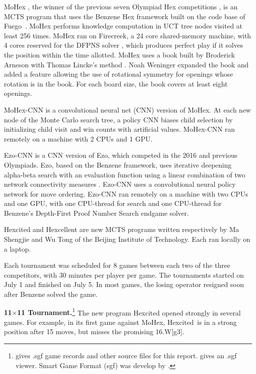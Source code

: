 \documentclass{icga}
\def\Eo{\mbox{\sc Ezo}}
\def\Ec{\mbox{\sc Ezo-CNN}}
\def\Hite{\mbox{\sc Hexcited}}
\def\Hent{\mbox{\sc Hexcellent}}
\def\Mx{\mbox{\sc MoHex}}
\def\Mc{\mbox{\sc MoHex-CNN}}
\def\Fuego{\mbox{\sc Fuego}}
\begin{document}
\Mx{} ,
the winner of the previous seven Olympiad Hex competitions ,
is an MCTS program that uses the Benzene Hex framework
built on the code base of \Fuego\ .
\Mx{} performs knowledge computation 
in UCT tree nodes visited at least 256 times.
\Mx{} ran on Firecreek, a 24 core shared-memory machine, 
with 4 cores reserved for the 
DFPNS solver , which
produces perfect play if it solves the
position within the time allotted.
\Mx{} uses a book built by Broderick Arneson with Thomas Lincke's method 
. 
Noah Weninger expanded the book and added a feature
allowing the use of rotational symmetry for openings
whose rotation is in the book.
For each board size, the book covers at least eight openings.

\Mc{} is a convolutional neural net (CNN) version of \Mx{}. 
At each new node of the Monte Carlo search tree, 
a policy CNN biases child selection by
initializing child visit and win counts with artificial values.
\Mc{} ran remotely on a machine with 2 CPUs and 1 GPU.

\Ec{} is a CNN version of \Eo{}, which competed
in the 2016 and previous Olympiads.
\Eo{}, based on the Benzene framework, 
uses iterative deepening alpha-beta search 
with an evaluation function using a linear combination of
two network connectivity measures .
\Ec{} uses a convolutional neural policy network
for move ordering.
\Ec{} ran remotely on a machine
with two CPUs and one GPU,
with one CPU-thread for search and one CPU-thread for
Benzene's Depth-First Proof Number Search endgame solver.

\Hite{} and \Hent{} are new MCTS programs written 
respectively by Ma Shengjie and Wu Tong
of the Beijing Institute of Technology.
Each ran locally on a laptop.

Each tournament was scheduled for 8 games between
each two of the three competitors, with 30 minutes per player per game.
The tournaments started on July 1 and finished on July 5.
In most games, the losing operator resigned
soon after Benzene solved the game.

{\large\bf 11$\times$11 Tournament.}\footnote{
  gives .sgf game records and other source files for this report.
   gives an .sgf viewer. Smart Game Format (sgf)
  was develop by .}
The new program \Hite{} opened strongly in several games.
For example, in its first game against \Mx, \Hite\ is in a strong
position after 15 moves, but misses the promising 16.W[g3].
\end{document}
